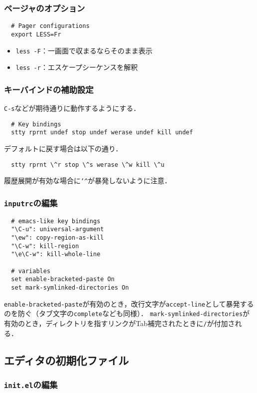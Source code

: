 \documentclass[a4paper]{jsarticle}
\begin{document}
\subsubsection{ページャのオプション}
\begin{lstlisting}
  # Pager configurations
  export LESS=Fr
\end{lstlisting}
\begin{itemize}
\item \texttt{less -F}：一画面で収まるならそのまま表示
\item \texttt{less -r}：エスケープシーケンスを解釈
\end{itemize}

\subsubsection{キーバインドの補助設定}
\texttt{C-s}などが期待通りに動作するようにする．
\begin{lstlisting}
  # Key bindings
  stty rprnt undef stop undef werase undef kill undef
\end{lstlisting}
デフォルトに戻す場合は以下の通り．
\begin{lstlisting}
  stty rprnt \^r stop \^s werase \^w kill \^u
\end{lstlisting}
履歴展開が有効な場合に\texttt{\char`\^{}}が暴発しないように注意．

\subsubsection{\texttt{inputrc}の編集}
\begin{lstlisting}
  # emacs-like key bindings
  "\C-u": universal-argument
  "\ew": copy-region-as-kill
  "\C-w": kill-region
  "\e\C-w": kill-whole-line
  
  # variables
  set enable-bracketed-paste On
  set mark-symlinked-directories On
\end{lstlisting}
\texttt{enable-bracketed-paste}が有効のとき，改行文字が\texttt{accept-line}として暴発するのを防ぐ（タブ文字の\texttt{complete}なども同様）．
\texttt{mark-symlinked-directories}が有効のとき，ディレクトリを指すリンクがTab補完されたときに\texttt{/}が付加される．

\subsection{エディタの初期化ファイル}
\subsubsection{\texttt{init.el}の編集}
\end{document}
